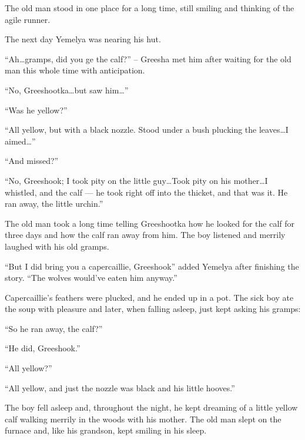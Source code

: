 \documentclass[b5paper,12pt,openany]{book}
\begin{document}
The old man stood in one place for a long time, still smiling and thinking of the agile runner.

The next day Yemelya was nearing his hut.

``Ah\ldots gramps, did you ge the calf?'' -- Greesha met him after waiting for the old man this whole time with anticipation.

``No, Greeshootka\ldots but saw him\ldots''

``Was he yellow?''

``All yellow, but with a black nozzle. Stood under a bush plucking the leaves\ldots I aimed\ldots''

``And missed?''

``No, Greeshook; I took pity on the little guy\ldots Took pity on his mother\ldots I whistled, and the calf --- he took right off into the thicket, and that was it. He ran away, the little urchin.''

The old man took a long time telling Greeshootka how he looked for the calf for three days and how the calf ran away from him. The boy listened and merrily laughed with his old gramps.

``But I did bring you a capercaillie, Greeshook'' added Yemelya after finishing the story. ``The wolves would've eaten him anyway.''

Capercaillie's feathers were plucked, and he ended up in a pot. The sick boy ate the soup with pleasure and later, when falling asleep, just kept asking his gramps:

``So he ran away, the calf?''

``He did, Greeshook.''

``All yellow?''

``All yellow, and just the nozzle was black and his little hooves.''

The boy fell asleep and, throughout the night, he kept dreaming of a little yellow calf walking merrily in the woods with his mother. The old man slept on the furnace and, like his grandson, kept smiling in his sleep.
\end{document}
